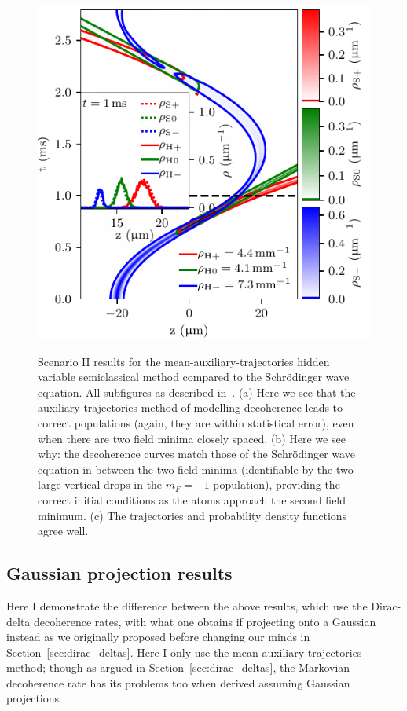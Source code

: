 {\begin{figure}
{    \includegraphics{figures/hidden_variables/hvsc_aux_mirror/trajectories.pdf}
    }
    \caption{Scenario II results for the mean-auxiliary-trajectories hidden variable semiclassical method compared to the Schr\"odinger wave equation. All subfigures as described in~. (a) Here we see that the auxiliary-trajectories method of modelling decoherence leads to correct populations (again, they are within statistical error), even when there are two field minima closely spaced. (b) Here we see why: the decoherence curves match those of the Schr\"odinger wave equation in between the two field minima (identifiable by the two large vertical drops in the $m_F=-1$ population), providing the correct initial conditions as the atoms approach the second field minimum. (c) The trajectories and probability density functions agree well.}\label{fig:scenario_two_aux}
\end{figure}
\restoregeometry}

\clearpage

\subsection{Gaussian projection results}

Here I demonstrate the difference between the above results, which use the Dirac-delta decoherence rates, with what one obtains if projecting onto a Gaussian instead as we originally proposed before changing our minds in Section~\ref{sec:dirac_deltas}. Here I only use the mean-auxiliary-trajectories method; though as argued in Section~\ref{sec:dirac_deltas}, the Markovian decoherence rate has its problems too when derived assuming Gaussian projections.

